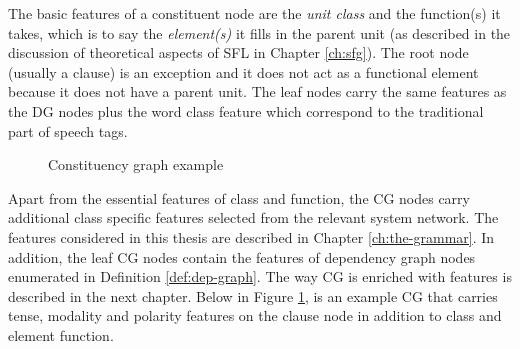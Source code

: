The basic features of a constituent node are the \textit{unit class} and the function(s) it takes, which is to say the \textit{element(s)} it fills in the parent unit (as described in the discussion of theoretical aspects of SFL in Chapter \ref{ch:sfg}). The root node (usually a clause) is an exception and it does not act as a functional element because it does not have a parent unit. The leaf nodes carry the same features as the DG nodes plus the word class feature which correspond to the traditional part of speech tags. 


\begin{figure}[!ht]
\centering
{}
\caption{Constituency graph example}
\label{fig:cg-graph}
\end{figure}

Apart from the essential features of class and function, the CG nodes carry additional class specific features selected from the relevant system network. The features considered in this thesis are described in Chapter \ref{ch:the-grammar}. In addition, the leaf CG nodes contain the features of dependency graph nodes enumerated in Definition \ref{def:dep-graph}. The way CG is enriched with features is described in the next chapter. Below in Figure \ref{fig:cg-graph}, is an example CG that carries tense, modality and polarity features on the clause node in addition to class and element function.

